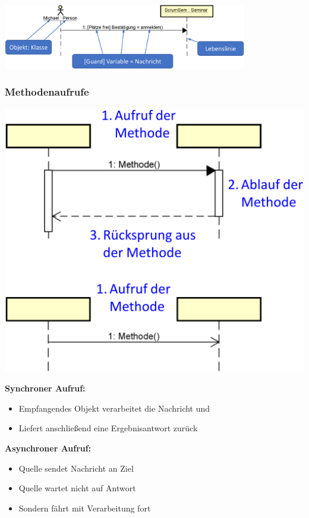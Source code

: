 \documentclass[11pt, a4paper]{article}
\begin{document}
\vspace{2em}

\centering \includegraphics[width=0.8\textwidth]{Sequenz-00.png}


\raggedright \subsubsection{Methodenaufrufe}

\vspace{1em}

\begin{minipage}[h]{0.4\textwidth}
    \raggedleft \includegraphics[width=1\textwidth]{Sequenz-02.png} 
\end{minipage}
\begin{minipage}[h]{0.55\textwidth}
    \tiny \textbf{Synchroner Aufruf:}
    \begin{itemize}
        \item Empfangendes Objekt verarbeitet die Nachricht und
        \item Liefert anschließend eine Ergebnisantwort zurück
    \end{itemize}
    \vspace{8em}
    \tiny \textbf{Asynchroner Aufruf:}
    \begin{itemize}
        \item Quelle sendet Nachricht an Ziel
        \item Quelle wartet nicht auf Antwort
        \item Sondern fährt mit Verarbeitung fort
    \end{itemize}    
\end{minipage}
\end{document}
